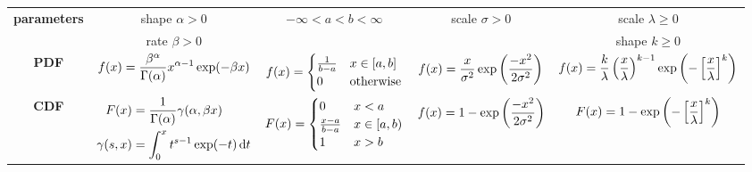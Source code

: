 \begin{landscape}
\begin{center}
\begin{tabular}{c|c|c|c|c}
				\hline
				\multirow{2}{2cm}{\textbf{parameters}}
				& shape $\alpha>0$ & $-\infty < a < b <\infty$ & scale $\sigma>0$& scale $\lambda\ge0$ \\
				& rate $\beta>0$ &&& shape $k\ge 0$ \\
				\hline
				\textbf{PDF} &
				\parbox{3cm}{$\begin{aligned}
					f(x) = \frac{\beta^\alpha}{\Gamma(\alpha)}x^{\alpha-1}\exp(-\beta x)\notag
				\end{aligned}$}
				&
				\parbox{3cm}{$\begin{aligned}
					f(x)=\begin{cases}
						\frac{1}{b-a} & x\in [a,b] \\ 0 & \text{otherwise}
					\end{cases}\notag
				\end{aligned}$}
				&
				\parbox{3cm}{$\begin{aligned}
					f(x) = \frac{x}{\sigma^2}\exp\left(\frac{-x^2}{2\sigma^2}\right)\notag
				\end{aligned}$}
				& 
				\parbox{3cm}{$\begin{aligned}
					f(x) = \frac{k}{\lambda}\left(\frac{x}{\lambda}\right)^{k-1}\exp\left(-\left[\frac{x}{\lambda}\right]^k\right) \notag
				\end{aligned}$}
				\\
				\hline
				\textbf{CDF} &
				\parbox{3cm}{$\begin{aligned}
					F(x) &= \frac{1}{\Gamma(\alpha)}\gamma(\alpha,\beta x) \notag \\
					\gamma(s,x)&= \int_0^x t^{s-1}\exp(-t)\,\mathrm{d}t \notag
				\end{aligned}$}
				&
				\parbox{3cm}{$\begin{aligned}
					F(x)=\begin{cases}
					0 & x<a \\ \frac{x-a}{b-a} & x\in [a,b) \\ 1 & x>b
					\end{cases}\notag
					\end{aligned}$}
				&
				\parbox{3cm}{$\begin{aligned}
					f(x) = 1-\exp\left(\frac{-x^2}{2\sigma^2}\right)\notag
					\end{aligned}$}
				& 
				\parbox{3cm}{$\begin{aligned}
					F(x) = 1-\exp\left(-\left[\frac{x}{\lambda}\right]^k\right) \notag
					\end{aligned}$}
				\\

\end{tabular}
\end{center}
\end{landscape}
